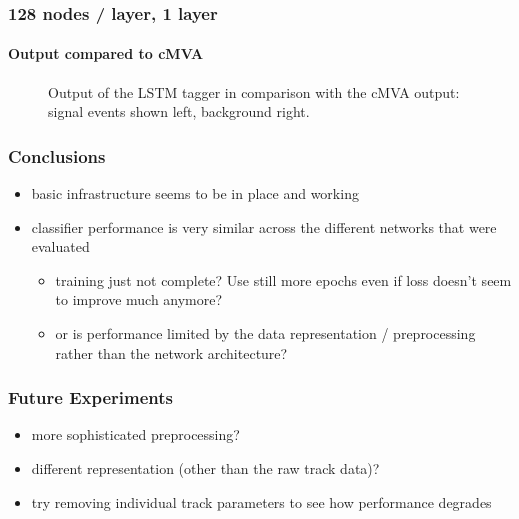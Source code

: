 \documentclass{beamer}
\begin{document}
\begin{frame}
  \frametitle{128 nodes / layer, 1 layer}
  \framesubtitle{Output compared to cMVA}
  \begin{figure}[htb]
    \centering

    \caption{Output of the LSTM tagger in comparison with the cMVA output: signal events shown left, background right.}
  \end{figure}
\end{frame}


\begin{frame}
  \frametitle{Conclusions}
  \begin{itemize}
  \item basic infrastructure seems to be in place and working
  \item classifier performance is very similar across the different networks that were evaluated
    \begin{itemize}
      \item training just not complete? Use still more epochs even if loss doesn't seem to improve much anymore?
      \item or is performance limited by the data representation / preprocessing rather than the network architecture?
    \end{itemize}
  \end{itemize}
\end{frame}

\begin{frame}
  \frametitle{Future Experiments}

  \begin{itemize}
  \item more sophisticated preprocessing?
  \item different representation (other than the raw track data)?
  \item try removing individual track parameters to see how performance degrades
  \end{itemize}
  
\end{frame}
\end{document}
